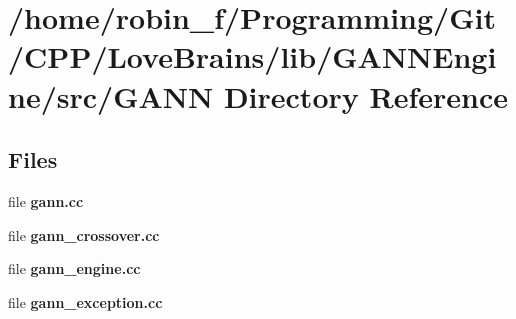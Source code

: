 \section{/home/robin\+\_\+f/\+Programming/\+Git/\+C\+P\+P/\+Love\+Brains/lib/\+G\+A\+N\+N\+Engine/src/\+G\+A\+N\+N Directory Reference}
\label{dir_8d8898ec0b5f56384be09b64dd994f70}
\subsection*{Files}
\begin{DoxyCompactItemize}
\item 
file {\bfseries gann.\+cc}
\item 
file {\bfseries gann\+\_\+crossover.\+cc}
\item 
file {\bfseries gann\+\_\+engine.\+cc}
\item 
file {\bfseries gann\+\_\+exception.\+cc}
\end{DoxyCompactItemize}
